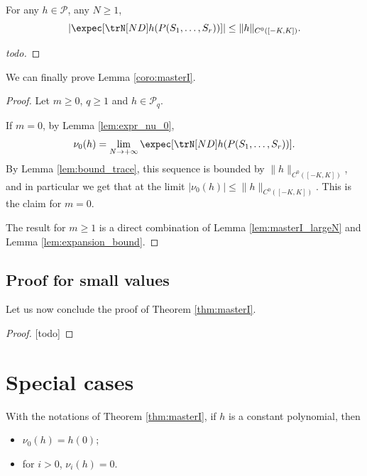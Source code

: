 \begin{lemma}
  \label{lem:bound_trace}
  For any $h \in \mathcal{P}$, any $N \geq 1$,
  \begin{equation*}
    |\expec [\trN[ND] h(P(S_1, \ldots, S_r))]| \leq \|h\|_{C^0([-K,K])}.
  \end{equation*}
\end{lemma}

\begin{proof}
  [todo]
\end{proof}

We can finally prove Lemma \ref{coro:masterI}.

\begin{proof}
  Let $m \geq 0$, $q \geq 1$ and $h \in \mathcal{P}_q$.

  If $m=0$, by Lemma \ref{lem:expr_nu_0},
  \begin{equation*}
        \nu_0(h) = \lim_{N \rightarrow +\infty} \expec [\trN[ND] h(P(S_1, \ldots, S_r))].
  \end{equation*}
  By Lemma \ref{lem:bound_trace}, this sequence is bounded by $\|h\|_{C^0([-K,K])}$,
  and in particular we get that at the limit
  $|\nu_0(h)| \leq \|h\|_{C^0([-K,K])}$. This is the claim for $m=0$.

  The result for $m \geq 1$ is a direct combination of Lemma \ref{lem:masterI_largeN} and
  Lemma \ref{lem:expansion_bound}.
\end{proof}


\subsection{Proof for small values}

Let us now conclude the proof of Theorem \ref{thm:masterI}.

\begin{proof}
  [todo]
\end{proof}

\section{Special cases}

\begin{lemma}
  \label{lem:value_nu_at_one}
  With the notations of Theorem \ref{thm:masterI},
  if $h$ is a constant polynomial, then
  \begin{itemize}
    \item $\nu_0(h)=h(0)$;
    \item for $i >0$, $\nu_i(h)=0$.
  \end{itemize}
\end{lemma}

